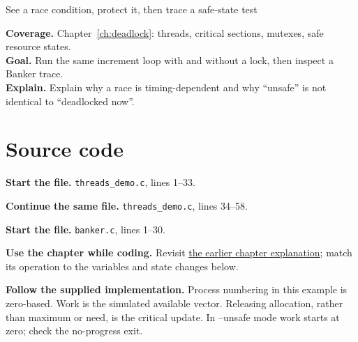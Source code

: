 \begin{labproject}{See a race condition, protect it, then trace a safe-state test}

\textbf{Coverage.} Chapter~\ref{ch:deadlock}: threads, critical sections, mutexes, safe resource states.\\
\textbf{Goal.} Run the same increment loop with and without a lock, then inspect a Banker trace.\\
\textbf{Explain.} Explain why a race is timing-dependent and why ``unsafe'' is not identical to ``deadlocked now''.




\section*{Source code}
\noindent\textbf{Start the file.} \texttt{threads\_demo.c}, lines 1--33.




\noindent\textbf{Continue the same file.} \texttt{threads\_demo.c}, lines 34--58.


\noindent\textbf{Start the file.} \texttt{banker.c}, lines 1--30.



\textbf{Use the chapter while coding.} Revisit \hyperref[ch:deadlock]{the earlier chapter explanation}; match its operation to the variables and state changes below.

\textbf{Follow the supplied implementation.} Process numbering in this example is zero-based. Work is the simulated available vector. Releasing allocation, rather than maximum or need, is the critical update. In --unsafe mode work starts at zero; check the no-progress exit.





\end{labproject}
